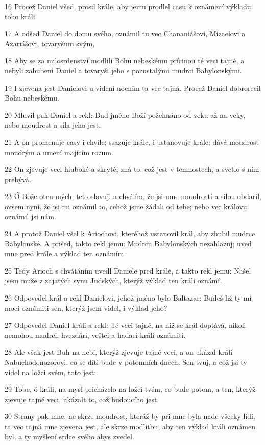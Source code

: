 \par 16 Procež Daniel všed, prosil krále, aby jemu prodlel casu k oznámení výkladu toho králi.
\par 17 A odšed Daniel do domu svého, oznámil tu vec Chananiášovi, Mizaelovi a Azariášovi, tovaryšum svým,
\par 18 Aby se za milosrdenství modlili Bohu nebeskému prícinou té veci tajné, a nebyli zahubeni Daniel a tovaryši jeho s pozustalými mudrci Babylonskými.
\par 19 I zjevena jest Danielovi u videní nocním ta vec tajná. Procež Daniel dobrorecil Bohu nebeskému.
\par 20 Mluvil pak Daniel a rekl: Bud jméno Boží požehnáno od veku až na veky, nebo moudrost a síla jeho jest.
\par 21 A on promenuje casy i chvíle; ssazuje krále, i ustanovuje krále; dává moudrost moudrým a umení majícím rozum.
\par 22 On zjevuje veci hluboké a skryté; zná to, což jest v temnostech, a svetlo s ním prebývá.
\par 23 Ó Bože otcu mých, tet oslavuji a chválím, že jsi mne moudrostí a silou obdaril, ovšem nyní, že jsi mi oznámil to, cehož jsme žádali od tebe; nebo vec královu oznámil jsi nám.
\par 24 A protož Daniel všel k Ariochovi, kteréhož ustanovil král, aby zhubil mudrce Babylonské. A prišed, takto rekl jemu: Mudrcu Babylonských nezahlazuj; uved mne pred krále a výklad ten oznámím.
\par 25 Tedy Arioch s chvátáním uvedl Daniele pred krále, a takto rekl jemu: Našel jsem muže z zajatých synu Judských, kterýž výklad ten králi oznámí.
\par 26 Odpovedel král a rekl Danielovi, jehož jméno bylo Baltazar: Budeš-liž ty mi moci oznámiti sen, kterýž jsem videl, i výklad jeho?
\par 27 Odpovedel Daniel králi a rekl: Té veci tajné, na niž se král doptává, nikoli nemohou mudrci, hvezdári, veštci a hadaci králi oznámiti.
\par 28 Ale však jest Buh na nebi, kterýž zjevuje tajné veci, a on ukázal králi Nabuchodonozorovi, co se díti bude v potomních dnech. Sen tvuj, a což jsi ty videl na ložci svém, toto jest:
\par 29 Tobe, ó králi, na mysl pricházelo na ložci tvém, co bude potom, a ten, kterýž zjevuje tajné veci, ukázalt to, což budoucího jest.
\par 30 Strany pak mne, ne skrze moudrost, kteráž by pri mne byla nade všecky lidi, ta vec tajná mne zjevena jest, ale skrze modlitbu, aby ten výklad králi oznámen byl, a ty myšlení srdce svého abys zvedel.
